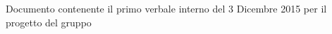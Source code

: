 Documento contenente il primo verbale interno del 3 Dicembre 2015 per il progetto \progetto del gruppo \gruppo
